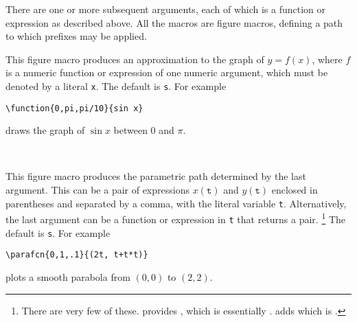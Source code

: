 \documentclass[letterpaper]{article}
\begin{document}
There are one or more subsequent arguments, each of which is a \MF{}
function or expression as described above. All the macros are figure
macros, defining a path to which prefixes may be applied.

\begin{cd}
%
\end{cd}

This figure macro produces an approximation to the graph of $y = f(x)$,
where $f$ is a \MF{} numeric function or expression of one numeric
argument, which must be denoted by a literal \texttt{x}. The default
 is \texttt{s}. For example
\begin{verbatim}
\function{0,pi,pi/10}{sin x}
\end{verbatim}
draws the graph of $\sin x$ between 0 and $\pi$.

\begin{cd}
%
    \\
%
\end{cd}

This figure macro produces the parametric path determined by the last
argument. This can be a pair of expressions $x(\mathtt{t})$ and
$y(\mathtt{t})$ enclosed in parentheses and separated by a comma, with
the literal variable \texttt{t}. Alternatively, the last argument can be
a \MF{} function or expression in \texttt{t} that returns a pair.%
    \footnote{There are very few of these. \CMF{} provides
    , which is essentially
    . \Mfp{} adds  which
    is .}
The default  is \texttt{s}. For example
\begin{verbatim}
\parafcn{0,1,.1}{(2t, t+t*t)}
\end{verbatim}
plots a smooth parabola from $(0,0)$ to $(2,2)$.

\begin{cd}
%
\end{cd}
\end{document}
